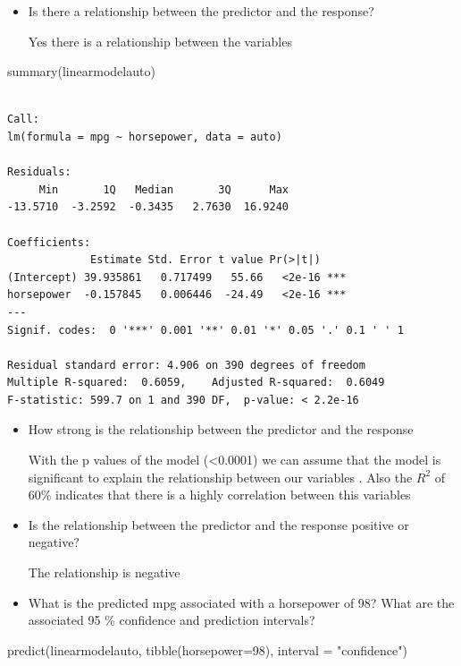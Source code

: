 \documentclass[
  letterpaper,
  DIV=11,
  numbers=noendperiod]{scrartcl}
\newenvironment{Shaded}{\begin{snugshade}}{\end{snugshade}}
\newcommand{\AttributeTok}[1]{\textcolor[rgb]{0.40,0.45,0.13}{#1}}
\newcommand{\DecValTok}[1]{\textcolor[rgb]{0.68,0.00,0.00}{#1}}
\newcommand{\FunctionTok}[1]{\textcolor[rgb]{0.28,0.35,0.67}{#1}}
\newcommand{\NormalTok}[1]{\textcolor[rgb]{0.00,0.23,0.31}{#1}}
\newcommand{\StringTok}[1]{\textcolor[rgb]{0.13,0.47,0.30}{#1}}
\begin{document}
\begin{itemize}
\item
  Is there a relationship between the predictor and the response?

  Yes there is a relationship between the variables
\end{itemize}

\begin{Shaded}
\begin{Highlighting}[]
\FunctionTok{summary}\NormalTok{(linearmodelauto)}
\end{Highlighting}
\end{Shaded}

\begin{verbatim}

Call:
lm(formula = mpg ~ horsepower, data = auto)

Residuals:
     Min       1Q   Median       3Q      Max 
-13.5710  -3.2592  -0.3435   2.7630  16.9240 

Coefficients:
             Estimate Std. Error t value Pr(>|t|)    
(Intercept) 39.935861   0.717499   55.66   <2e-16 ***
horsepower  -0.157845   0.006446  -24.49   <2e-16 ***
---
Signif. codes:  0 '***' 0.001 '**' 0.01 '*' 0.05 '.' 0.1 ' ' 1

Residual standard error: 4.906 on 390 degrees of freedom
Multiple R-squared:  0.6059,    Adjusted R-squared:  0.6049 
F-statistic: 599.7 on 1 and 390 DF,  p-value: < 2.2e-16
\end{verbatim}

\begin{itemize}
\item
  How strong is the relationship between the predictor and the response

  With the p values of the model (\textless0.0001) we can assume that
  the model is significant to explain the relationship between our
  variables . Also the \(R^{2}\) of 60\% indicates that there is a
  highly correlation between this variables
\item
  Is the relationship between the predictor and the response positive or
  negative?

  The relationship is negative
\item
  What is the predicted mpg associated with a horsepower of 98? What are
  the associated 95 \% confidence and prediction intervals?
\end{itemize}

\begin{Shaded}
\begin{Highlighting}[]
\FunctionTok{predict}\NormalTok{(linearmodelauto, }\FunctionTok{tibble}\NormalTok{(}\AttributeTok{horsepower=}\DecValTok{98}\NormalTok{), }\AttributeTok{interval =} \StringTok{"confidence"}\NormalTok{)}
\end{Highlighting}
\end{Shaded}
\end{document}

